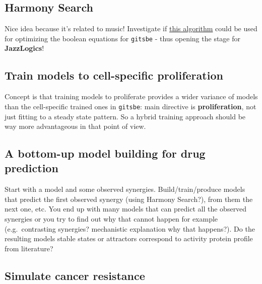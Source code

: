 \documentclass[
  12pt,
]{book}
\begin{document}
\hypertarget{harmony-search}{%
\subsection*{Harmony Search}\label{harmony-search}}

Nice idea because it's related to music!
Investigate if \href{https://doi.org/10.1016/j.proeng.2016.07.510}{this algorithm} could be used for optimizing the boolean equations for \texttt{gitsbe} - thus opening the stage for \textbf{JazzLogics}!

\hypertarget{train-models-to-cell-specific-proliferation}{%
\subsection*{Train models to cell-specific proliferation}\label{train-models-to-cell-specific-proliferation}}

Concept is that training models to proliferate provides a wider variance of models than the cell-specific trained ones in \texttt{gitsbe}: main directive is \textbf{proliferation}, not just fitting to a steady state pattern.
So a hybrid training approach should be way more advantageous in that point of view.

\hypertarget{a-bottom-up-model-building-for-drug-prediction}{%
\subsection*{A bottom-up model building for drug prediction}\label{a-bottom-up-model-building-for-drug-prediction}}

Start with a model and some observed synergies.
Build/train/produce models that predict the first observed synergy (using Harmony Search?), from them the next one, etc.
You end up with many models that can predict all the observed synergies or you try to find out why that cannot happen for example (e.g.~contrasting synergies? mechanistic explanation why that happens?).
Do the resulting models stable states or attractors correspond to activity protein profile from literature?

\hypertarget{simulate-cancer-resistance}{%
\subsection*{Simulate cancer resistance}\label{simulate-cancer-resistance}}
\end{document}
